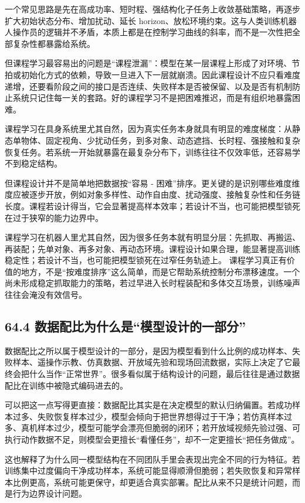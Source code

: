 一个常见思路是先在高成功率、短时程、强结构化子任务上收敛基础策略，再逐步扩大初始状态分布、增加扰动、延长 horizon、放松环境约束。这与人类训练机器人操作员的逻辑并不矛盾，本质上都是在控制学习曲线的斜率，而不是一次性把全部复杂性都暴露给系统。

但课程学习最容易出的问题是“课程泄漏”：模型在某一层课程上形成了对环境、节拍或初始化方式的依赖，导致一旦进入下一层就崩溃。因此课程设计不应只看难度递增，还要看阶段之间的接口是否连续、失败样本是否被保留、以及是否有机制防止系统只记住每一关的套路。好的课程学习不是把困难推迟，而是有组织地暴露困难。

课程学习在具身系统里尤其自然，因为真实任务本身就具有明显的难度梯度：从静态单物体、固定视角、少扰动任务，到多对象、动态遮挡、长时程、强接触和复杂恢复任务。若系统一开始就暴露在最复杂分布下，训练往往不仅效率低，还容易学不到稳定结构。

但课程设计并不是简单地把数据按“容易 - 困难”排序。更关键的是识别哪些难度维度应被逐步开放，例如对象多样性、动作自由度、扰动强度、接触复杂性和任务链长度。课程若设计得当，它会显著提高样本效率；若设计不当，也可能把模型锁死在过于狭窄的能力边界中。

课程学习在机器人里尤其自然，因为很多任务本就有明显分层：先抓取、再搬运、再装配；先单对象、再多对象、再动态环境。课程设计如果合理，能显著提高训练稳定性；若设计不当，也可能把模型锁死在过窄任务轨迹上。 课程学习真正有价值的地方，不是“按难度排序”这么简单，而是它帮助系统控制分布漂移速度。一个尚未形成稳定抓取能力的策略，若过早进入长时程装配和多体交互场景，训练噪声往往会淹没有效信号。

\subsection*{64.4 数据配比为什么是“模型设计的一部分”}


数据配比之所以属于模型设计的一部分，是因为模型看到什么比例的成功样本、失败样本、遥操作示教、仿真数据、开放域先验和现场回流数据，实际上决定了它最终会把什么当作“正常世界”。很多看似属于结构设计的问题，最后往往是通过数据配比在训练中被隐式编码进去的。

可以把这一点写得更直接：数据配比其实是在决定模型的默认归纳偏置。若成功样本过多、失败恢复样本过少，模型会倾向于把世界想得过于干净；若仿真样本过多、真机样本过少，模型可能学会漂亮但脆弱的闭环；若开放域视频先验过强、可执行动作数据不足，则模型会更擅长“看懂任务”，却不一定更擅长“把任务做成”。

这也解释了为什么同一模型结构在不同团队手里会表现出完全不同的行为特征。若训练集中过度偏向干净成功样本，系统可能显得顺滑但脆弱；若失败恢复和异常样本比例更高，系统可能更保守，却更适合真实部署。配比从来不只是统计问题，而是行为边界设计问题。

